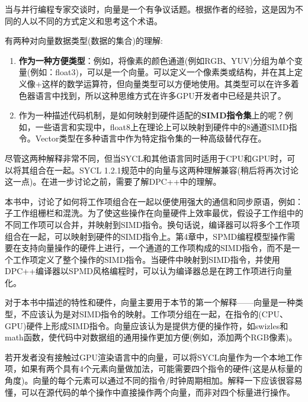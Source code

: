 当与并行编程专家交谈时，向量是一个有争议话题。根据作者的经验，这是因为不同的人以不同的方式定义和思考这个术语。\par

有两种对向量数据类型(数据的集合)的理解:\par

\begin{enumerate}
	\item \textbf{作为一种方便类型}：例如，将像素的颜色通道(例如RGB、YUV)分组为单个变量(例如：float3)，可以是一个向量。可以定义一个像素类或结构，并在其上定义像+这样的数学运算符，但向量类型可以方便地使用。其类型可以在许多着色器语言中找到，所以这种思维方式在许多GPU开发者中已经是共识了。
	\item 作为一种描述代码机制，是如何映射到硬件适配的\textbf{SIMD指令集}上的呢？例如，一些语言和实现中，float8上在理论上可以映射到硬件中的8通道SIMD指令。Vector类型在多种语言中作为特定指令集的一种高级替代存在。
\end{enumerate}

尽管这两种解释非常不同，但当SYCL和其他语言同时适用于CPU和GPU时，可以将其组合在一起。SYCL 1.2.1规范中的向量与这两种理解兼容(稍后将再次讨论这一点)。在进一步讨论之前，需要了解DPC++中的理解。\par

本书中，讨论了如何将工作项组合在一起以便使用强大的通信和同步原语，例如：子工作组栅栏和混洗。为了使这些操作在向量硬件上效率最优，假设子工作组中的不同工作项可以合并，并映射到SIMD指令。换句话说，编译器可以将多个工作项组合在一起，可以映射到硬件的SIMD指令上。第4章中，SPMD编程模型操作需要在支持向量操作的硬件上进行，一个通道的工作项构成的SIMD指令，而不是一个工作项定义了整个操作的SIMD指令。当硬件中映射到SIMD指令，并使用DPC++编译器以SPMD风格编程时，可以认为编译器总是在跨工作项进行向量化。\par

对于本书中描述的特性和硬件，向量主要用于本节的第一个解释——向量是一种类型，不应该认为是对SIMD指令的映射。工作项分组在一起，在指令的(CPU、GPU)硬件上形成SIMD指令。向量应该认为是提供方便的操作符，如swizles和math函数，使代码中对数据组的通用操作更加方便(例如，添加两个RGB像素)。\par

若开发者没有接触过GPU渲染语言中的向量，可以将SYCL向量作为一个本地工作项，如果有两个具有4个元素向量做加法，可能需要四个指令的硬件(这是从标量的角度)。向量的每个元素可以通过不同的指令/时钟周期相加。解释一下应该很容易懂，可以在源代码的单个操作中直接操作两个向量，而非对四个标量进行操作。\par

